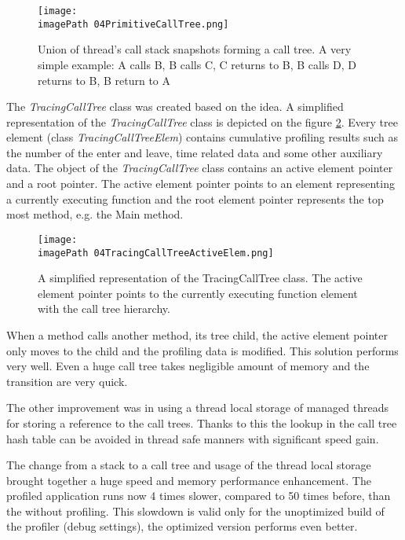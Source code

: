 \begin{figure}
	\centering
		\texttt{[image: \\imagePath 04PrimitiveCallTree.png]}
		\caption{Union of thread's call stack snapshots forming a call tree. A very simple example: A calls  B, B calls C, C returns to B, B calls D, D returns to B, B return to A }
	\label{fig:04PrimitiveCallTree}
\end{figure}

The \textit{TracingCallTree} class was created based on the idea.
A simplified representation of the \textit{TracingCallTree} class is depicted on the figure \ref{fig:04TracingCallTreeActiveElem}. Every tree element (class \textit{TracingCallTreeElem}) contains cumulative profiling results such as the number of the enter and leave, time related data and some other auxiliary data. The object of the \textit{TracingCallTree} class contains an active element pointer and a root pointer. The active element pointer points to an element representing a currently executing function and the root element pointer represents the top most method, e.g. the Main method. 


\begin{figure}
	\centering
		\texttt{[image: \\imagePath 04TracingCallTreeActiveElem.png]}
		\caption{A simplified representation of the TracingCallTree class. The active element pointer points to the currently executing function element with the call tree hierarchy. }
	\label{fig:04TracingCallTreeActiveElem}
\end{figure}


When a method calls another method, its tree child, the active element pointer only moves to the child and the profiling data is modified. This solution performs very well. Even a huge call tree takes negligible amount of memory and the transition are very quick. 

The other improvement was in using a thread local storage of managed threads for storing a reference to the call trees. Thanks to this the lookup in the call tree hash table can be avoided in thread safe manners with significant speed gain. 

The change from a stack to a call tree and usage of the thread local storage brought together a huge speed and memory performance enhancement. The profiled application runs now 4 times slower, compared to 50 times before, than the without profiling. This slowdown is valid only for the unoptimized build of the profiler (debug settings), the optimized version performs even better. 

